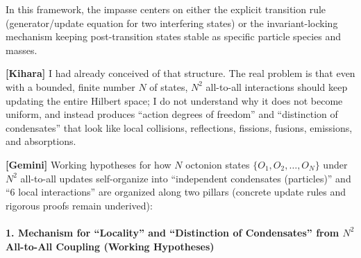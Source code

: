 \documentclass[
  a4paper,
]{article}
\begin{document}
In this framework, the impasse centers on either the explicit transition
rule (generator/update equation for two interfering states) or the
invariant-locking mechanism keeping post-transition states stable as
specific particle species and masses.

\textbf{{[}Kihara{]}} I had already conceived of that structure. The
real problem is that even with a bounded, finite number \(N\) of states,
\(N^2\) all-to-all interactions should keep updating the entire Hilbert
space; I do not understand why it does not become uniform, and instead
produces ``action degrees of freedom'' and ``distinction of
condensates'' that look like local collisions, reflections, fissions,
fusions, emissions, and absorptions.

\textbf{{[}Gemini{]}} Working hypotheses for how \(N\) octonion states
\(\{O_1, O_2, \dots, O_N\}\) under \(N^2\) all-to-all updates
self-organize into ``independent condensates (particles)'' and ``6 local
interactions'' are organized along two pillars (concrete update rules
and rigorous proofs remain underived):

\paragraph{\texorpdfstring{1. Mechanism for ``Locality'' and
``Distinction of Condensates'' from \(N^2\) All-to-All Coupling (Working
Hypotheses)}{1. Mechanism for ``Locality'' and ``Distinction of Condensates'' from N\^{}2 All-to-All Coupling (Working Hypotheses)}}\label{mechanism-for-locality-and-distinction-of-condensates-from-n2-all-to-all-coupling-working-hypotheses}
\end{document}
